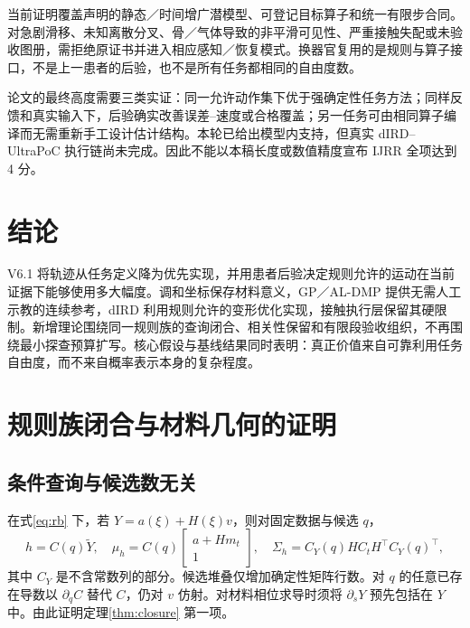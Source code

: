 \documentclass[UTF8,11pt,a4paper,fontset=fandol]{ctexart}
\numberwithin{equation}{section}
\theoremstyle{definition}
\begin{document}
当前证明覆盖声明的静态／时间增广潜模型、可登记目标算子和统一有限步合同。对急剧滑移、未知离散分叉、骨／气体导致的非平滑可见性、严重接触失配或未验收图册，需拒绝原证书并进入相应感知／恢复模式。换器官复用的是规则与算子接口，不是上一患者的后验，也不是所有任务都相同的自由度数。

论文的最终高度需要三类实证：同一允许动作集下优于强确定性任务方法；同样反馈和真实输入下，后验确实改善误差--速度或合格覆盖；另一任务可由相同算子编译而无需重新手工设计估计结构。本轮已给出模型内支持，但真实 dIRD--UltraPoC 执行链尚未完成。因此不能以本稿长度或数值精度宣布 IJRR 全项达到 4 分。

\section{结论}
V6.1 将轨迹从任务定义降为优先实现，并用患者后验决定规则允许的运动在当前证据下能够使用多大幅度。调和坐标保存材料意义，GP／AL-DMP 提供无需人工示教的连续参考，dIRD 利用规则允许的变形优化实现，接触执行层保留其硬限制。新增理论围绕同一规则族的查询闭合、相关性保留和有限段验收组织，不再围绕最小探查预算扩写。核心假设与基线结果同时表明：真正价值来自可靠利用任务自由度，而不来自概率表示本身的复杂程度。

\appendix
\section{规则族闭合与材料几何的证明}
\label{app:closure}
\subsection{条件查询与候选数无关}
在式\eqref{eq:rb} 下，若 $Y=a(\xi)+H(\xi)v$，则对固定数据与候选 $q$，
\begin{equation}
 h=C(q)\widetilde Y,\quad
 \mu_h=C(q)\begin{bmatrix}a+Hm_t\\1\end{bmatrix},\quad
 \Sigma_h=C_Y(q)H C_tH^\top C_Y(q)^\top,
 \label{eq:conditionalquery}
\end{equation}
其中 $C_Y$ 是不含常数列的部分。候选堆叠仅增加确定性矩阵行数。对 $q$ 的任意已存在导数以 $\partial_qC$ 替代 $C$，仍对 $v$ 仿射。对材料相位求导时须将 $\partial_sY$ 预先包括在 $Y$ 中。由此证明定理\ref{thm:closure} 第一项。
\end{document}
